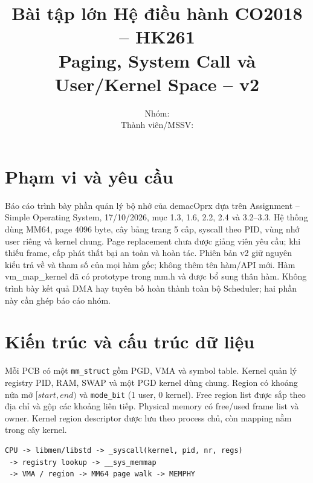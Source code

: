 \documentclass[11pt,a4paper]{article}
\title{Bài tập lớn Hệ điều hành CO2018 -- HK261\\Paging, System Call và User/Kernel Space -- v2}
\author{Nhóm: \underline{\hspace{4cm}} \\ Thành viên/MSSV: \underline{\hspace{5cm}}}
\date{}
\begin{document}
\raggedright
\setlength{\parskip}{5pt}
\maketitle
\section{Phạm vi và yêu cầu}
Báo cáo trình bày phần quản lý bộ nhớ của demacOprx dựa trên Assignment -- Simple Operating System, 17/10/2026, mục 1.3, 1.6, 2.2, 2.4 và 3.2--3.3. Hệ thống dùng MM64, page 4096 byte, cây bảng trang 5 cấp, syscall theo PID, vùng nhớ user riêng và kernel chung. Page replacement chưa được giảng viên yêu cầu; khi thiếu frame, cấp phát thất bại an toàn và hoàn tác. Phiên bản v2 giữ nguyên kiểu trả về và tham số của mọi hàm gốc; không thêm tên hàm/API mới. Hàm vm\_map\_kernel đã có prototype trong mm.h và được bổ sung thân hàm. Không trình bày kết quả DMA hay tuyên bố hoàn thành toàn bộ Scheduler; hai phần này cần ghép báo cáo nhóm.
\section{Kiến trúc và cấu trúc dữ liệu}
Mỗi PCB có một \texttt{mm\_struct} gồm PGD, VMA và symbol table. Kernel quản lý registry PID, RAM, SWAP và một PGD kernel dùng chung. Region có khoảng nửa mở $[start,end)$ và \texttt{mode\_bit} (1 user, 0 kernel). Free region list được sắp theo địa chỉ và gộp các khoảng liên tiếp. Physical memory có free/used frame list và owner. Kernel region descriptor được lưu theo process chủ, còn mapping nằm trong cây kernel.
\begin{verbatim}
CPU -> libmem/libstd -> _syscall(kernel, pid, nr, regs)
 -> registry lookup -> __sys_memmap
 -> VMA / region -> MM64 page walk -> MEMPHY
\end{verbatim}
\end{document}
